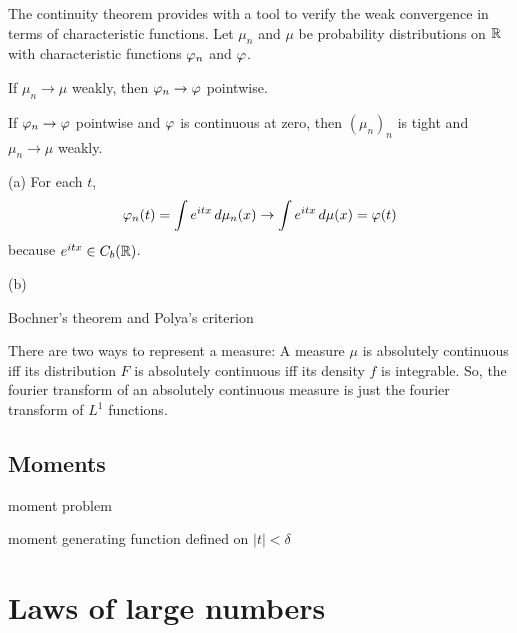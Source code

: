 \documentclass{../note}
\begin{document}
\begin{prb}
The continuity theorem provides with a tool to verify the weak convergence in terms of characteristic functions.
Let $\mu_n$ and $\mu$ be probability distributions on $\mathbb{R}$ with characteristic functions $\varphi_n$ and $\varphi$.
\begin{parts}
\item If $\mu_n\to\mu$ weakly, then $\varphi_n\to\varphi$ pointwise.
\item If $\varphi_n\to\varphi$ pointwise and $\varphi$ is continuous at zero, then $(\mu_n)_n$ is tight and $\mu_n\to\mu$ weakly.
\end{parts}
\end{prb}
\begin{pf}
(a)
For each $t$,
\[\varphi_n(t)=\int e^{itx}\,d\mu_n(x)\to\int e^{itx}\,d\mu(x)=\varphi(t)\]
because $e^{itx}\in C_b(\mathbb{R})$.

(b)


\end{pf}

\begin{prb}
Bochner's theorem and Polya's criterion
\end{prb}


There are two ways to represent a measure:
A measure $\mu$ is absolutely continuous iff its distribution $F$ is absolutely continuous iff its density $f$ is integrable.
So, the fourier transform of an absolutely continuous measure is just the fourier transform of $L^1$ functions.



\section{Moments}

moment problem

moment generating function defined on $|t|<\delta$





















\chapter{Laws of large numbers}
\end{document}
